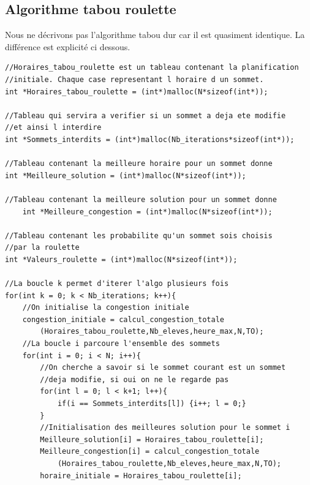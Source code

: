 \documentclass[a4paper,11pt]{article}
\begin{document}
		\subsection{Algorithme tabou roulette}
			Nous ne décrivons pas l'algorithme tabou dur car il est quasiment identique. La différence est explicité ci dessous.
\begin{lstlisting}
//Horaires_tabou_roulette est un tableau contenant la planification 
//initiale. Chaque case representant l horaire d un sommet.
int *Horaires_tabou_roulette = (int*)malloc(N*sizeof(int*));

//Tableau qui servira a verifier si un sommet a deja ete modifie 
//et ainsi l interdire
int *Sommets_interdits = (int*)malloc(Nb_iterations*sizeof(int*));

//Tableau contenant la meilleure horaire pour un sommet donne
int *Meilleure_solution = (int*)malloc(N*sizeof(int*));

//Tableau contenant la meilleure solution pour un sommet donne
	int *Meilleure_congestion = (int*)malloc(N*sizeof(int*));

//Tableau contenant les probabilite qu'un sommet sois choisis
//par la roulette
int *Valeurs_roulette = (int*)malloc(N*sizeof(int*));
	
//La boucle k permet d'iterer l'algo plusieurs fois
for(int k = 0; k < Nb_iterations; k++){
	//On initialise la congestion initiale 
	congestion_initiale = calcul_congestion_totale
		(Horaires_tabou_roulette,Nb_eleves,heure_max,N,TO);
	//La boucle i parcoure l'ensemble des sommets
	for(int i = 0; i < N; i++){
		//On cherche a savoir si le sommet courant est un sommet 
		//deja modifie, si oui on ne le regarde pas
		for(int l = 0; l < k+1; l++){
			if(i == Sommets_interdits[l]) {i++; l = 0;}
		}
		//Initialisation des meilleures solution pour le sommet i
		Meilleure_solution[i] = Horaires_tabou_roulette[i];
		Meilleure_congestion[i] = calcul_congestion_totale
			(Horaires_tabou_roulette,Nb_eleves,heure_max,N,TO);
		horaire_initiale = Horaires_tabou_roulette[i];


\end{lstlisting}
\end{document}
